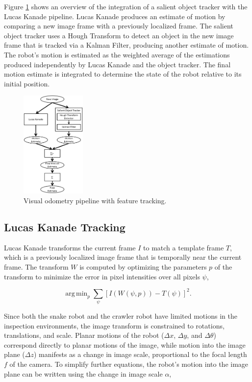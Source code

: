 \documentclass[letterpaper, 10 pt, conference]{ieeeconf}
\DeclareMathOperator*{\argmin}{arg\,min}
\begin{document}
Figure \ref{approach} shows an overview of the integration of a salient object tracker with the Lucas Kanade pipeline. Lucas Kanade produces an estimate of motion by comparing a new image frame with a previously localized frame. The salient object tracker uses a Hough Transform to detect an object in the new image frame that is tracked via a Kalman Filter, producing another estimate of motion. The robot's motion is estimated as the weighted average of the estimations produced independently by Lucas Kanade and the object tracker. The final motion estimate is integrated to determine the state of the robot relative to its initial position.

\begin{figure}[tb]
	\centering
	\includegraphics[height=200px]{approach_overview.png}
	\caption{Visual odometry pipeline with feature tracking.}
    \label{approach}
\end{figure}

\subsection{Lucas Kanade Tracking}

Lucas Kanade transforms the current frame $I$ to match a template frame $T$, which is a previously localized image frame that is temporally near the current frame. The transform $W$ is computed by optimizing the parameters $p$ of the transform to minimize the error in pixel intensities over all pixels $\psi$,

\begin{equation} \label{eq:lkt_min}
    \argmin_p \sum_{\psi} [I(W(\psi, p)) - T(\psi)]^2.
\end{equation}

Since both the snake robot and the crawler robot have limited motions in the inspection environments, the image transform is constrained to rotations, translations, and scale. Planar motions of the robot ($\Delta x$, $\Delta y$, and $\Delta \theta$) correspond directly to planar motions of the image, while motion into the image plane ($\Delta z$) manifests as a change in image scale, proportional to the focal length $f$ of the camera. To simplify further equations, the robot's motion into the image plane can be written using the change in image scale $\alpha$,
\end{document}
